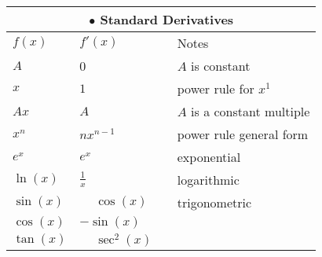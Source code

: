 \newline\phantom{blank line here please}\\
{\hspace*{0.55cm}
	\renewcommand{\arraystretch}{1.2}
		\begin{tabular}{llll}
			\multicolumn{4}{c}{$\bullet$ Standard Derivatives}\\\midrule
			$f(x)$ & $f'(x)$  &&Notes\\ \midrule
			$A$&0&&$A$ is constant\\
			$x$&$1$&&power rule for $x^1$\\
			$Ax$&$A$&&$A$ is a constant multiple\\ \midrule
			$x^n$ & $nx^{n-1}$ &&power rule general form\\
			$e^x$ & $e^x$  && exponential\\
			$\ln(x)$ & $\frac{1}{x}$ &&logarithmic\\ \midrule
			$\sin(x)$ & $\phantom{-}\cos(x)$  &&trigonometric \\
			$\cos(x)$ & $-\sin(x)$ && \\
			$\tan(x)$ & $\phantom{-}\sec^2(x)$ && \\ \bottomrule
		\end{tabular}
}
